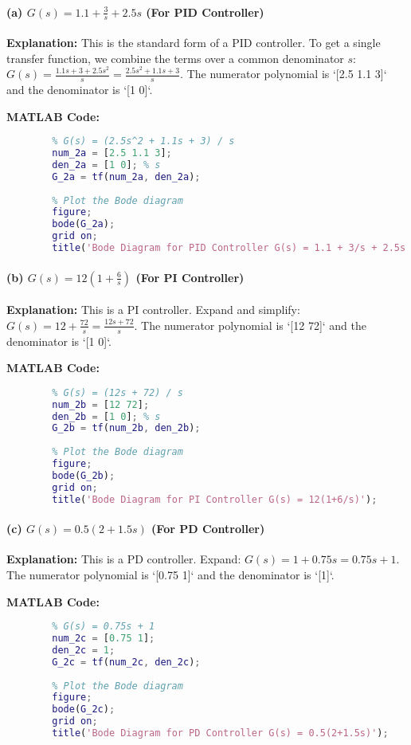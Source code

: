\documentclass[a4paper,12pt]{article}
\begin{document}
	\paragraph{(a) $G(s) = 1.1 + \frac{3}{s} + 2.5s$ (For PID Controller)}
	\textbf{Explanation:}
	This is the standard form of a PID controller. To get a single transfer function, we combine the terms over a common denominator $s$:
	$G(s) = \frac{1.1s + 3 + 2.5s^2}{s} = \frac{2.5s^2 + 1.1s + 3}{s}$.
	The numerator polynomial is `[2.5 1.1 3]` and the denominator is `[1 0]`.
	
	\textbf{MATLAB Code:}
	\begin{lstlisting}[language=Matlab, caption=MATLAB Code for Problem 2(a)]
		% Define the PID controller transfer function
		% G(s) = (2.5s^2 + 1.1s + 3) / s
		num_2a = [2.5 1.1 3];
		den_2a = [1 0]; % s
		G_2a = tf(num_2a, den_2a);
		
		% Plot the Bode diagram
		figure;
		bode(G_2a);
		grid on;
		title('Bode Diagram for PID Controller G(s) = 1.1 + 3/s + 2.5s');
	\end{lstlisting}
	
	\paragraph{(b) $G(s) = 12(1+\frac{6}{s})$ (For PI Controller)}
	\textbf{Explanation:}
	This is a PI controller. Expand and simplify:
	$G(s) = 12 + \frac{72}{s} = \frac{12s + 72}{s}$.
	The numerator polynomial is `[12 72]` and the denominator is `[1 0]`.
	
	\textbf{MATLAB Code:}
	\begin{lstlisting}[language=Matlab, caption=MATLAB Code for Problem 2(b)]
		% Define the PI controller transfer function
		% G(s) = (12s + 72) / s
		num_2b = [12 72];
		den_2b = [1 0]; % s
		G_2b = tf(num_2b, den_2b);
		
		% Plot the Bode diagram
		figure;
		bode(G_2b);
		grid on;
		title('Bode Diagram for PI Controller G(s) = 12(1+6/s)');
	\end{lstlisting}
	
	\paragraph{(c) $G(s) = 0.5(2+1.5s)$ (For PD Controller)}
	\textbf{Explanation:}
	This is a PD controller. Expand:
	$G(s) = 1 + 0.75s = 0.75s + 1$.
	The numerator polynomial is `[0.75 1]` and the denominator is `[1]`.
	
	\textbf{MATLAB Code:}
	\begin{lstlisting}[language=Matlab, caption=MATLAB Code for Problem 2(c)]
		% Define the PD controller transfer function
		% G(s) = 0.75s + 1
		num_2c = [0.75 1];
		den_2c = 1;
		G_2c = tf(num_2c, den_2c);
		
		% Plot the Bode diagram
		figure;
		bode(G_2c);
		grid on;
		title('Bode Diagram for PD Controller G(s) = 0.5(2+1.5s)');
	\end{lstlisting}
	
\end{document}
